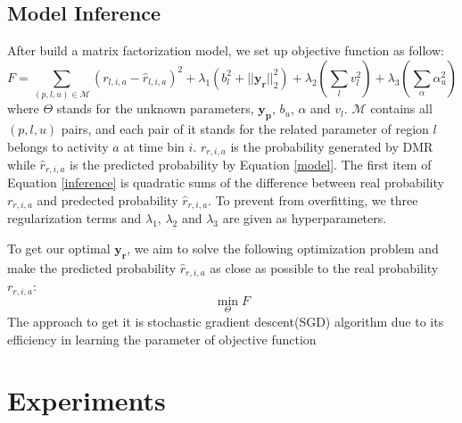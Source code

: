 \documentclass[runningheads]{llncs}
\begin{document}
\subsection{Model Inference}
After build a matrix factorization model, we set up objective function as follow:
\begin{equation}
F=\sum\limits_{(p,l,u)\in\mathcal{M}}(r_{l,i,a}-\hat{r}_{l,i,a})^2+\lambda_1(b_l^2+||{\bm{y_r}}||_2^2)+\lambda_2(\sum\limits_{l}v_l^2)+\lambda_3(\sum\limits_{\alpha}\alpha_u^2)
\label{inference}
\end{equation}
where $\Theta$ stands for the unknown parameters, $\bm{y_p}$, $b_u$, $\alpha$ and $v_l$.
$\mathcal{M}$ contains all $(p,l,u)$ pairs, and each pair of it stands for the related parameter of region $l$ belongs to activity $a$ at time bin $i$.
$r_{r,i,a}$ is the probability generated by DMR while $\hat{r}_{r,i,a}$ is the predicted probability by Equation \ref{model}.
The first item of Equation \ref{inference} is quadratic sums of the difference between real probability $r_{r,i,a}$ and predected probability $\hat{r}_{r,i,a}$.
To prevent from overfitting, we three regularization terms and $\lambda_1$, $\lambda_2$ and $\lambda_3$ are given as hyperparameters.


To get our optimal $\bm{y_r}$, we aim to solve the following optimization problem and make the predicted probability $\hat{r}_{r,i,a}$ as close as possible to the real probability$r_{r,i,a}$:
$$\min\limits_{\Theta} F$$
The approach to get it is stochastic gradient descent(SGD) algorithm due to its efficiency in learning the parameter of objective function























\section{Experiments}\label{sec:experiments}
\end{document}
